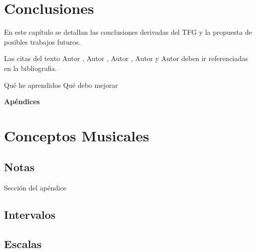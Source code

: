 \documentclass[12pt,twoside,titlepage]{report}
\newcommand\blankpage{%
    \newpage
    \null
    \thispagestyle{empty}%
    \newpage}
\begin{document}
\chapter{Conclusiones}

En este capítulo se detallan las conclusiones derivadas del TFG y la propuesta de posibles trabajos futuros.

Las citas del texto Autor \cite{giaquinta}, Autor \cite{fortune}, Autor \cite{fortuneB}, Autor \cite{mitchell} y Autor \cite{morrey} deben ir referenciadas en la bibliografia.


Qué he aprendidos
Qué debo mejorar

\blankpage




{}
\footnotesize{
%


}
\raggedbottom
\afterpage{\blankpage}
\newpage



\appendix
{}
{}
\mbox{}
\vfill
\begin{center}
\begin{Huge}
\textbf{Apéndices}
\end{Huge}
\end{center}
\vfill
\mbox{}
\thispagestyle{empty}
\newpage
\mbox{}
\thispagestyle{empty}
\newpage

\chapter{Conceptos Musicales}
\label{sec:apendice}

\section{Notas}

Sección del apéndice

\section{Intervalos}
\section{Escalas}






\end{document}
